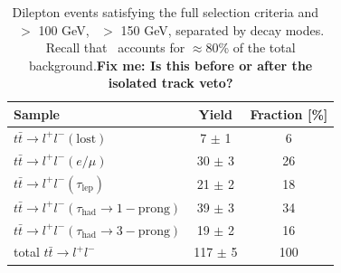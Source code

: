 \begin{table}[!ht]
\begin{center}
\begin{tabular}{l|c|c}
\hline
            Sample					&                Yield   & 	Fraction [\%]\\
\hline
\hline
$t\bar{t} \rightarrow l^{+}l^{-} (\mathrm{lost})$   &       7 $\pm$ 1 	& 	6\\
$t\bar{t} \rightarrow l^{+}l^{-} (e/\mu)$   &      30 $\pm$ 3  	& 26\\
$t\bar{t} \rightarrow l^{+}l^{-} (\tau_{\mathrm{lep}})$   &      21 $\pm$ 2  	& 18\\
$t\bar{t} \rightarrow l^{+}l^{-} (\tau_{\mathrm{had}}\rightarrow \mathrm{1-prong})$   &      39 $\pm$ 3  & 34\\
$t\bar{t} \rightarrow l^{+}l^{-} (\tau_{\mathrm{had}}\rightarrow \mathrm{3-prong})$   &      19 $\pm$ 2  & 16\\
\hline
         total $t\bar{t} \rightarrow l^{+}l^{-} $  &     117 $\pm$ 5  & 100\\
\hline
\end{tabular}
\caption{Dilepton events satisfying the full selection criteria
 and \met\ $>$ 100 GeV, \mt\ $>$ 150 GeV,  separated by decay modes.
Recall that \ttll\ accounts for $\approx80$\% of the total background.{\bf Fix me: Is this before or after the isolated track veto?}
\label{tab:ttdlcomposition}}
\end{center}
\end{table}

